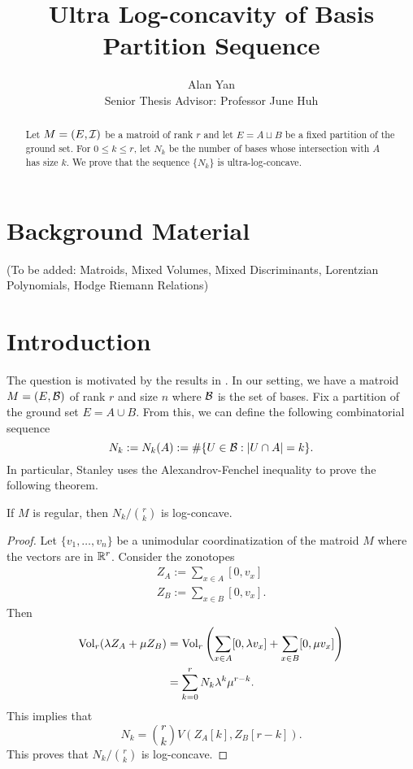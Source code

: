 \documentclass[12pt]{article}
\title{Ultra Log-concavity of Basis Partition Sequence}
\author{Alan Yan \\ Senior Thesis Advisor: Professor June Huh}
\begin{document}
\maketitle

\begin{abstract}
	Let $M = (E, \mathcal{I})$ be a matroid of rank $r$ and let $E = A \sqcup B$ be a fixed partition of the ground set. For $0 \leq k \leq r$, let $N_k$ be the number of bases whose intersection with $A$ has size $k$. We prove that the sequence $\{N_k\}$ is ultra-log-concave. 
\end{abstract}
\tableofcontents

\newpage 

\section{Background Material}

(To be added: Matroids, Mixed Volumes, Mixed Discriminants, Lorentzian Polynomials, Hodge Riemann Relations)

\section{Introduction}

The question is motivated by the results in \cite{STANLEY}. In our setting, we have a matroid $M = (E, \mathcal{B})$ of rank $r$ and size $n$ where $\mathcal{B}$ is the set of bases. Fix a partition of the ground set $E = A \cup B$. From this, we can define the following combinatorial sequence
\[
	N_k := N_k(A) := \# \{U \in \mathcal{B} : |U \cap A| = k\}.
\]
In particular, Stanley uses the Alexandrov-Fenchel inequality to prove the following theorem. 
\begin{thm} \label{stanley-theorem}
	If $M$ is regular, then $N_k / \binom{r}{k}$ is log-concave. 
\end{thm}

\begin{proof}
	Let $\{v_1, \ldots, v_n\}$ be a unimodular coordinatization of the matroid $M$ where the vectors are in $\mathbb{R}^r$. Consider the zonotopes
	\begin{align*}
		Z_A := \sum_{x \in A} [0, v_x] \\
		Z_B := \sum_{x \in B} [0, v_x].
	\end{align*}
	Then 
	\begin{align*}
		\operatorname{Vol}_r (\lambda Z_A + \mu Z_B) & = \operatorname{Vol}_r \left ( \sum_{x \in A} [0, \lambda v_x] + \sum_{x \in B} [0, \mu v_x] \right ) \\
		& = \sum_{k = 0}^r N_k \lambda^k \mu^{r-k}.
	\end{align*}
	This implies that 
	\[
		N_k = \binom{r}{k} V(Z_A[k], Z_B[r-k]). 
	\]
	This proves that $N_k / \binom{r}{k}$ is log-concave. 
\end{proof}
\end{document}
